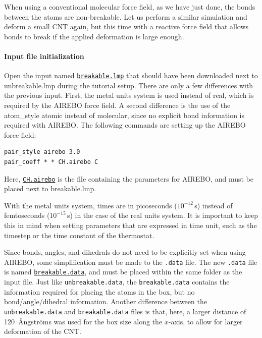 \documentclass[9pt,tutorial]{livecoms}
\newcommand{\lmpcmd}[1]{\hspace{0pt}\colorbox{listing}{\textcolor{command}{\small{#1}}}\hspace{0pt}} %
\newcommand{\lmpcmdnote}[1]{\hspace{0pt}\colorbox{note_listing}{\textcolor{command}{\small{#1}}}\hspace{0pt}} %
\newcommand{\flecmd}[1]{\textcolor{command}{\texttt{#1}}} %
\newcommand{\dwlcmd}[1]{\textcolor{download}{\texttt{#1}}} %
\newcommand{\filepath}{https://raw.githubusercontent.com/lammpstutorials/lammpstutorials-article/main/files/}
\begin{document}
When using a conventional molecular force field, as we have just done, the bonds between the atoms
are non-breakable.  Let us perform a similar simulation and deform a small
CNT again, but this time with a reactive force field that allows bonds
to break if the applied deformation is large enough.

\paragraph{Input file initialization}

Open the input named
\href{\filepath tutorial2/breakable.lmp}{\dwlcmd{breakable.lmp}} that should have
been downloaded next to \lmpcmd{unbreakable.lmp} during the tutorial setup.
There are only a few differences with the previous input.  First, the \lmpcmd{metal}
units system is used instead of \lmpcmd{real}, which is
required by the AIREBO force field.  A second difference is the use of the
\lmpcmd{atom\_style atomic} instead of \lmpcmd{molecular}, since no explicit
bond information is required with AIREBO.  The following commands are
setting up the AIREBO force field:
\begin{lstlisting}
pair_style airebo 3.0
pair_coeff * * CH.airebo C
\end{lstlisting}
Here, \href{\filepath tutorial2/CH.airebo}{\dwlcmd{CH.airebo}} is the file
containing the parameters for AIREBO, and must be placed next
to \lmpcmd{breakable.lmp}.

\begin{note}
With the \lmpcmdnote{metal} units system, times are in picoseconds ($10^{-12}$\,s)
instead of femtoseconds ($10^{-15}$\,s) in the case of the \lmpcmdnote{real} units system.
It is important to keep this in mind when setting parameters that are expressed
in time unit, such as the timestep or the time constant of the thermostat.
\end{note}

Since bonds, angles, and dihedrals do not need to be
explicitly set when using AIREBO, some simplification must be made to the
\flecmd{.data} file.  The new \flecmd{.data}
file is named \href{\filepath tutorial2/breakable.data}{\dwlcmd{breakable.data}},
and must be placed within the same folder as the input file.  Just like \flecmd{unbreakable.data},
the \flecmd{breakable.data} contains the information
required for placing the atoms in the box, but no bond/angle/dihedral information.
Another difference between the \flecmd{unbreakable.data} and \flecmd{breakable.data} files
is that, here, a larger distance of 120~Ångströms was used for the box size along
the $x$-axis, to allow for larger deformation of the CNT.
\end{document}
